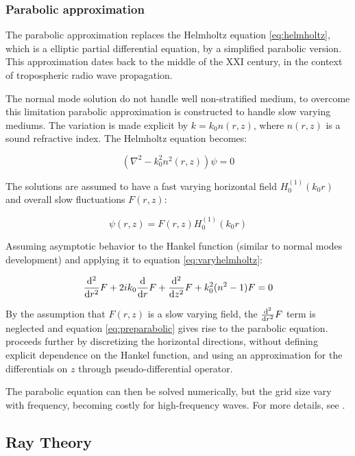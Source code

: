 \subsubsection{Parabolic approximation}

The parabolic approximation replaces the Helmholtz equation \ref{eq:helmholtz},
which is a elliptic partial differential equation, by a simplified parabolic
version. This approximation dates back to the middle of the $\mathrm{XXI}$
century, in the context of tropospheric radio wave propagation.

The normal mode solution do not handle well non-stratified medium, to overcome
this limitation parabolic approximation is constructed to handle slow varying
mediums. The variation is made explicit by $k = k_0n(r,z)$, where $n(r,z)$ is a
sound refractive index\cite{LURTON}. The Helmholtz equation becomes:

\begin{equation}
\label{eq:varyhelmholtz}
(\nabla^2 - k_0^2n^2(r,z))\psi = 0 
\end{equation}

The solutions are assumed to have a fast varying horizontal field
$H_0^{(1)}(k_0r)$ and overall slow fluctuations $F(r,z)$:

\begin{equation*}
\psi(r,z) = F(r,z)H_0^{(1)}(k_0r)
\end{equation*}

Assuming asymptotic behavior to the Hankel function (similar to normal modes
development) and applying it to equation \ref{eq:varyhelmholtz}:

\begin{equation}
\label{eq:preparabolic}
\frac{\mathrm{d^{2}}}{\mathrm{d}{r}^{2}}F + 2ik_0\frac{\mathrm{d}}{\mathrm{d}r}F + \frac{\mathrm{d^{2}}}{\mathrm{d}{z}^{2}}F + k_0^2(n^2-1)F = 0
\end{equation}

By the assumption that $F(r,z)$ is a slow varying field, the $\frac{\mathrm{d^{2}}}{\mathrm{d}{r}^{2}}F$
term is neglected and equation \ref{eq:preparabolic} gives rise to the parabolic
equation. \citet{LURTON} proceeds further by discretizing the horizontal
directions, without defining explicit dependence on the Hankel function, and
using an approximation for the differentials on $z$ through pseudo-differential
operator.

The parabolic equation can then be solved numerically, but the grid size vary
with frequency, becoming costly for high-frequency waves. For more
details, see \citet{jensen2011computational}.

\subsection{Ray Theory}
\label{ss:raytheory}

